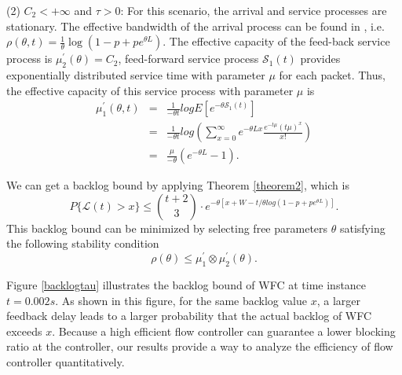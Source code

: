 \documentclass[paper]{ieice}
\begin{document}
(2) $C_2<+\infty$ and $\tau> 0$: For this scenario, the arrival and service processes are stationary. The effective bandwidth of the arrival process can be found in \cite{Chan94}, i.e. $\rho(\theta,t)=\frac{1}{\theta}\log(1-p+pe^{\theta L})$. The effective capacity of the feed-back service process is $\mu_2^\prime(\theta)=C_2$, feed-forward service process $\mathcal{S}_1(t)$ provides exponentially distributed service time with parameter $\mu$ for each packet. Thus, the effective capacity of this service process with parameter $\mu$ is
\begin{eqnarray*}
\mu_1^\prime(\theta,t)&=& \frac{1}{-\theta t}log E[e^{-\theta \mathcal{S}_1(t)}]\\
&=& \frac{1}{-\theta t}log(\sum_{x=0}^\infty e^{-\theta Lx}\frac{e^{-t\mu}(t\mu)^x}{x!})\\
&=& \frac{\mu}{-\theta}(e^{-\theta L}-1).
\end{eqnarray*}

We can get a backlog bound by applying Theorem \ref{theorem2}, which is
\begin{equation}\label{bernoullibound}
P\{\mathcal{L}(t)>x\}\leq {t+2\choose 3}\cdot e^{-\theta [x+W-t/\theta log(1-p+pe^{\theta L})]}.
\end{equation}
This backlog bound can be minimized by selecting free parameters $\theta$ satisfying the following stability condition
\begin{equation}\label{stabilitycond3}
\rho(\theta)\leq \mu_1^\prime\otimes\mu_2^\prime(\theta).
\end{equation}

Figure \ref{backlogtau} illustrates the backlog bound of WFC at time instance $t=0.002s$. As shown in this figure, for the same backlog value $x$, a larger feedback delay leads to a larger probability that the actual backlog of WFC exceeds $x$. Because a high efficient flow controller can guarantee a lower blocking ratio at the controller, our results  provide a way to analyze the efficiency of flow controller quantitatively.
\end{document}
